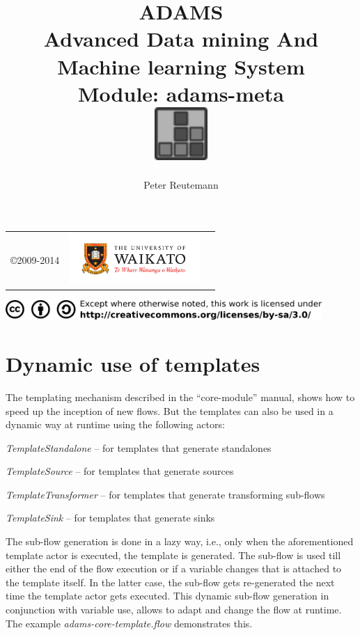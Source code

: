 \documentclass[a4paper]{book}
\title{
  \textbf{ADAMS} \\
  {\Large \textbf{A}dvanced \textbf{D}ata mining \textbf{A}nd \textbf{M}achine
  learning \textbf{S}ystem} \\
  {\Large Module: adams-meta} \\
  \vspace{1cm}
  \includegraphics[width=2cm]{images/meta-module.png} \\
}
\author{
  Peter Reutemann
}
\begin{document}
\begin{titlepage}
\maketitle

\thispagestyle{empty}
\center
\begin{table}[b]
	\begin{tabular}{c l l}
		\parbox[c][2cm]{2cm}{\copyright 2009-2014} &
		\parbox[c][2cm]{5cm}{\includegraphics[width=5cm]{images/coat_of_arms.pdf}} \\
	\end{tabular}
	\includegraphics[width=12cm]{images/cc.png} \\
\end{table}

\end{titlepage}

\tableofcontents
\listoffigures



\newpage
\chapter{Dynamic use of templates}
\label{dynamic}
The templating mechanism described in the ``core-module'' manual, shows how to 
speed up the inception of new flows. But the templates can also be used in a
dynamic way at runtime using the following actors:
\begin{tight_itemize}
	\item \textit{TemplateStandalone} -- for templates that generate standalones
	\item \textit{TemplateSource} -- for templates that generate sources
	\item \textit{TemplateTransformer} -- for templates that generate transforming
	sub-flows
	\item \textit{TemplateSink} -- for templates that generate sinks
\end{tight_itemize}
The sub-flow generation is done in a lazy way, i.e., only when the
aforementioned template actor is executed, the template is generated. The
sub-flow is used till either the end of the flow execution or if a variable
changes that is attached to the template itself. In the latter case, the
sub-flow gets re-generated the next time the template actor gets executed. This
dynamic sub-flow generation in conjunction with variable use, allows to adapt
and change the flow at runtime. The example \textit{adams-core-template.flow}
demonstrates this.
\end{document}
